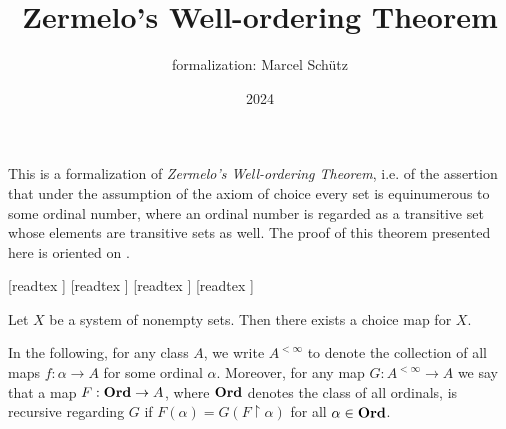 \documentclass{article}
\title{Zermelo's Well-ordering Theorem}
\author{\Naproche formalization: Marcel Schütz}
\date{2024}
\begin{document}
  \maketitle

  \noindent This is a formalization of \textit{Zermelo's Well-ordering Theorem},
  i.e. of the assertion that under the assumption of the axiom of choice every
  set is equinumerous to some ordinal number, where an ordinal number is
  regarded as a transitive set whose elements are transitive sets as well.
  The proof of this theorem presented here is oriented on \cite{Koepke2018}.

  \begin{imports}
    \begin{forthel}
      [readtex ]
      [readtex ]
      [readtex ]
      [readtex ]
    \end{forthel}
  \end{imports}

  \begin{forthel}
    \begin{axiom*}
      Let $X$ be a system of nonempty sets.
      Then there exists a choice map for $X$.
    \end{axiom*}
  \end{forthel}

  \noindent In the following, for any class $A$, we write $A^{< \infty}$ to
  denote the collection of all maps $f : \alpha \to A$ for some ordinal
  $\alpha$.
  Moreover, for any map $G : A^{< \infty} \to A$ we say that a map $F : \textbf{Ord} \to
  A$, where $\textbf{Ord}$ denotes the class of all ordinals, is recursive regarding $G$
  if $F(\alpha) = G(F \restriction \alpha)$ for all $\alpha \in \textbf{Ord}$.
\end{document}
